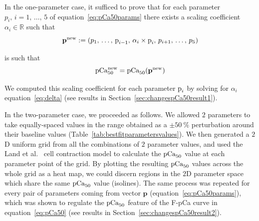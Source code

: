 \vspace{0.2cm}
In the one-parameter case, it sufficed to prove that for each parameter $p_i,\,i=1,\,\dots,\,5$ of equation~\eqref{eq:pCa50params} there exists a scaling coefficient $\alpha_i\in\mathbb{R}$ such that
%
\begin{equation}
    \mathbf{p}^{\text{new}} := (p_1,\,\dots,\,\textrm{p}_{i-1},\,\alpha_i\times\textrm{p}_i,\,p_{i+1},\,\dots,\,p_5)
\end{equation}

\vspace{0.2cm}
is such that
%
\begin{equation}
    \textrm{pCa}_{50}^{\text{new}} = \textrm{pCa}_{50}(\mathbf{p}^{\text{new}})
\end{equation}

\vspace{0.2cm}
We computed this scaling coefficient for each parameter $\textrm{p}_i$ by solving for $\alpha_i$ equation~\eqref{eq:delta} (see results in Section~\ref{sec:changespCa50result1}).

\vspace{0.2cm}
In the two-parameter case, we proceeded as follows. We allowed $2$ parameters to take equally-spaced values in the range obtained as a $\pm\SI{50}{\percent}$ perturbation around their baseline values (Table~\ref{tab:bestfitparametersvalues}). We then generated a $2$D uniform grid from all the combinations of $2$ parameter values, and used the Land et al.~\cite{Land:2012} cell contraction model to calculate the $\textrm{pCa}_{50}$ value at each parameter point of the grid. By plotting the resulting $\textrm{pCa}_{50}$ values across the whole grid as a heat map, we could discern regions in the $2$D parameter space which share the same $\textrm{pCa}_{50}$ value (isolines). The same process was repeated for every pair of parameters coming from vector $\mathbf{p}$ (equation~\eqref{eq:pCa50params}), which was shown to regulate the $\textrm{pCa}_{50}$ feature of the F-pCa curve in equation~\eqref{eq:pCa50} (see results in Section~\ref{sec:changespCa50result2}).


%
%
%
